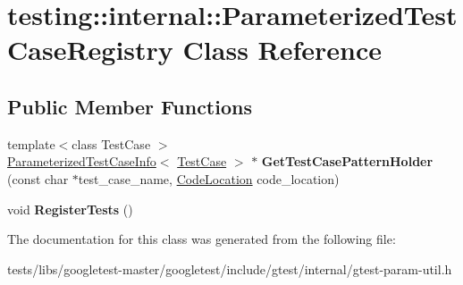 \hypertarget{classtesting_1_1internal_1_1ParameterizedTestCaseRegistry}{}\section{testing\+:\+:internal\+:\+:Parameterized\+Test\+Case\+Registry Class Reference}
\label{classtesting_1_1internal_1_1ParameterizedTestCaseRegistry}
\subsection*{Public Member Functions}
\begin{DoxyCompactItemize}
\item 
\mbox{\label{classtesting_1_1internal_1_1ParameterizedTestCaseRegistry_af525816aa348f9e33f5d900965991388}} 
{\footnotesize template$<$class Test\+Case $>$ }\\\hyperlink{classtesting_1_1internal_1_1ParameterizedTestCaseInfo}{Parameterized\+Test\+Case\+Info}$<$ \hyperlink{classtesting_1_1TestCase}{Test\+Case} $>$ $\ast$ {\bfseries Get\+Test\+Case\+Pattern\+Holder} (const char $\ast$test\+\_\+case\+\_\+name, \hyperlink{structtesting_1_1internal_1_1CodeLocation}{Code\+Location} code\+\_\+location)
\item 
\mbox{\label{classtesting_1_1internal_1_1ParameterizedTestCaseRegistry_ad5b63c8fe94f3d51d039a76c001c9223}} 
void {\bfseries Register\+Tests} ()
\end{DoxyCompactItemize}


The documentation for this class was generated from the following file\+:\begin{DoxyCompactItemize}
\item 
tests/libs/googletest-\/master/googletest/include/gtest/internal/gtest-\/param-\/util.\+h\end{DoxyCompactItemize}
